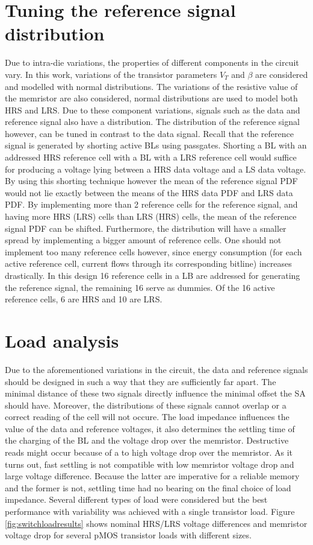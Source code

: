 \documentclass[journal]{IEEEtran}
\begin{document}
\section{Tuning the reference signal distribution}\label{ref}
Due to intra-die variations, the properties of different components in the circuit vary. In this work, variations of the transistor parameters $V_{T}$ and $\beta$ are considered and modelled with normal distributions. The variations of the resistive value of the memristor are also considered, normal distributions are used to model both HRS and LRS. Due to these component variations, signals such as the data and reference signal also have a distribution. The distribution of the reference signal however, can be tuned in contrast to the data signal. Recall that the reference signal is generated by shorting active BLs using passgates. Shorting a BL with an addressed HRS reference cell with a BL with a LRS reference cell would suffice for producing a voltage lying between a HRS data voltage and a LS data voltage. By using this shorting technique however the mean of the reference signal PDF would not lie exactly between the means of the HRS data PDF and LRS data PDF. By implementing more than 2 reference cells for the reference signal, and having more HRS (LRS) cells than LRS (HRS) cells, the mean of the reference signal PDF can be shifted. Furthermore, the distribution will have a smaller spread by implementing a bigger amount of reference cells. One should not implement too many reference cells however, since energy consumption (for each active reference cell, current flows through its corresponding bitline) increases drastically. In this design 16 reference cells in a LB are addressed for generating the reference signal, the remaining 16 serve as dummies. Of the 16 active reference cells, 6 are HRS and 10 are LRS.

\section{Load analysis}\label{load}
Due to the aforementioned variations in the circuit, the data and reference signals should be designed in such a way that they are sufficiently far apart. The minimal distance of these two signals directly influence the minimal offset the SA should have. Moreover, the distributions of these signals cannot overlap or a correct reading of the cell will not occure. The load impedance influences the value of the data and reference voltages, it also determines the settling time of the charging of the BL and the voltage drop over the memristor. Destructive reads might occur because of a to high voltage drop over the memristor. As it turns out, fast settling is not compatible with low memristor voltage drop and large voltage difference. Because the latter are imperative for a reliable memory and the former is not, settling time had no bearing on the final choice of load impedance. Several different types of load were considered \cite{bulkload} but the best performance with variability was achieved with a single transistor load. Figure \ref{fig:switchloadresults} shows nominal HRS/LRS voltage differences and memristor voltage drop for several pMOS transistor loads with different sizes. 
\end{document}
